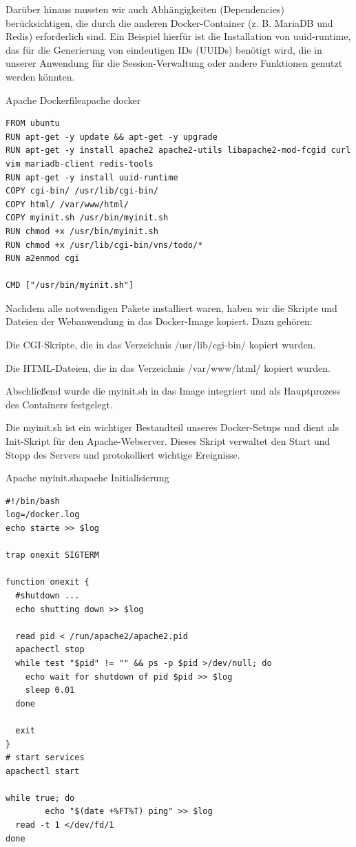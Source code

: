 Darüber hinaus mussten wir auch Abhängigkeiten (Dependencies) berücksichtigen, die durch die anderen Docker-Container (z. B. MariaDB und Redis) erforderlich sind. Ein Beispiel hierfür ist die Installation von uuid-runtime, das für die Generierung von eindeutigen IDs (UUIDs) benötigt wird, die in unserer Anwendung für die Session-Verwaltung oder andere Funktionen genutzt werden könnten.
\begin{code}{Apache Dockerfile}{apache docker}
        \begin{verbatim}
FROM ubuntu
RUN apt-get -y update && apt-get -y upgrade
RUN apt-get -y install apache2 apache2-utils libapache2-mod-fcgid curl vim mariadb-client redis-tools
RUN apt-get -y install uuid-runtime
COPY cgi-bin/ /usr/lib/cgi-bin/
COPY html/ /var/www/html/
COPY myinit.sh /usr/bin/myinit.sh
RUN chmod +x /usr/bin/myinit.sh
RUN chmod +x /usr/lib/cgi-bin/vns/todo/*
RUN a2enmod cgi

CMD ["/usr/bin/myinit.sh"]  
 \end{verbatim}
\end{code}

Nachdem alle notwendigen Pakete installiert waren, haben wir die Skripte und Dateien der Webanwendung in das Docker-Image kopiert. Dazu gehören:

Die CGI-Skripte, die in das Verzeichnis /usr/lib/cgi-bin/ kopiert wurden.

Die HTML-Dateien, die in das Verzeichnis /var/www/html/ kopiert wurden.

Abschließend wurde die myinit.sh in das Image integriert und als Hauptprozess des Containers festgelegt.


Die myinit.sh ist ein wichtiger Bestandteil unseres Docker-Setups und dient als Init-Skript für den Apache-Webserver. Dieses Skript verwaltet den Start und Stopp des Servers und protokolliert wichtige Ereignisse.

\begin{code}{Apache myinit.sh}{apache Initialisierung}
        \begin{verbatim}
#!/bin/bash
log=/docker.log
echo starte >> $log

trap onexit SIGTERM

function onexit {
  #shutdown ...
  echo shutting down >> $log

  read pid < /run/apache2/apache2.pid
  apachectl stop
  while test "$pid" != "" && ps -p $pid >/dev/null; do
    echo wait for shutdown of pid $pid >> $log
    sleep 0.01
  done

  exit
}
# start services
apachectl start

while true; do
        echo "$(date +%FT%T) ping" >> $log
  read -t 1 </dev/fd/1
done
  \end{verbatim}
\end{code}

